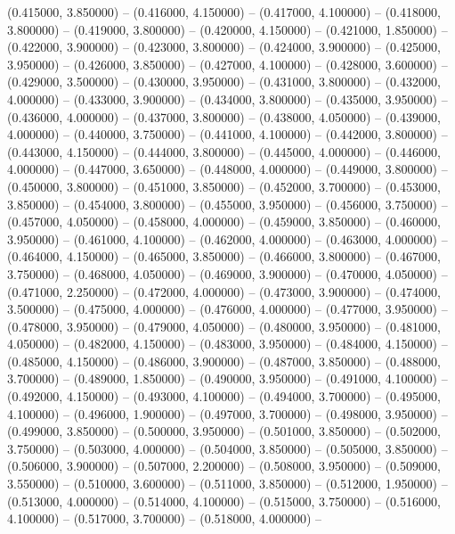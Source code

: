 (0.415000, 3.850000) -- 
(0.416000, 4.150000) -- 
(0.417000, 4.100000) -- 
(0.418000, 3.800000) -- 
(0.419000, 3.800000) -- 
(0.420000, 4.150000) -- 
(0.421000, 1.850000) -- 
(0.422000, 3.900000) -- 
(0.423000, 3.800000) -- 
(0.424000, 3.900000) -- 
(0.425000, 3.950000) -- 
(0.426000, 3.850000) -- 
(0.427000, 4.100000) -- 
(0.428000, 3.600000) -- 
(0.429000, 3.500000) -- 
(0.430000, 3.950000) -- 
(0.431000, 3.800000) -- 
(0.432000, 4.000000) -- 
(0.433000, 3.900000) -- 
(0.434000, 3.800000) -- 
(0.435000, 3.950000) -- 
(0.436000, 4.000000) -- 
(0.437000, 3.800000) -- 
(0.438000, 4.050000) -- 
(0.439000, 4.000000) -- 
(0.440000, 3.750000) -- 
(0.441000, 4.100000) -- 
(0.442000, 3.800000) -- 
(0.443000, 4.150000) -- 
(0.444000, 3.800000) -- 
(0.445000, 4.000000) -- 
(0.446000, 4.000000) -- 
(0.447000, 3.650000) -- 
(0.448000, 4.000000) -- 
(0.449000, 3.800000) -- 
(0.450000, 3.800000) -- 
(0.451000, 3.850000) -- 
(0.452000, 3.700000) -- 
(0.453000, 3.850000) -- 
(0.454000, 3.800000) -- 
(0.455000, 3.950000) -- 
(0.456000, 3.750000) -- 
(0.457000, 4.050000) -- 
(0.458000, 4.000000) -- 
(0.459000, 3.850000) -- 
(0.460000, 3.950000) -- 
(0.461000, 4.100000) -- 
(0.462000, 4.000000) -- 
(0.463000, 4.000000) -- 
(0.464000, 4.150000) -- 
(0.465000, 3.850000) -- 
(0.466000, 3.800000) -- 
(0.467000, 3.750000) -- 
(0.468000, 4.050000) -- 
(0.469000, 3.900000) -- 
(0.470000, 4.050000) -- 
(0.471000, 2.250000) -- 
(0.472000, 4.000000) -- 
(0.473000, 3.900000) -- 
(0.474000, 3.500000) -- 
(0.475000, 4.000000) -- 
(0.476000, 4.000000) -- 
(0.477000, 3.950000) -- 
(0.478000, 3.950000) -- 
(0.479000, 4.050000) -- 
(0.480000, 3.950000) -- 
(0.481000, 4.050000) -- 
(0.482000, 4.150000) -- 
(0.483000, 3.950000) -- 
(0.484000, 4.150000) -- 
(0.485000, 4.150000) -- 
(0.486000, 3.900000) -- 
(0.487000, 3.850000) -- 
(0.488000, 3.700000) -- 
(0.489000, 1.850000) -- 
(0.490000, 3.950000) -- 
(0.491000, 4.100000) -- 
(0.492000, 4.150000) -- 
(0.493000, 4.100000) -- 
(0.494000, 3.700000) -- 
(0.495000, 4.100000) -- 
(0.496000, 1.900000) -- 
(0.497000, 3.700000) -- 
(0.498000, 3.950000) -- 
(0.499000, 3.850000) -- 
(0.500000, 3.950000) -- 
(0.501000, 3.850000) -- 
(0.502000, 3.750000) -- 
(0.503000, 4.000000) -- 
(0.504000, 3.850000) -- 
(0.505000, 3.850000) -- 
(0.506000, 3.900000) -- 
(0.507000, 2.200000) -- 
(0.508000, 3.950000) -- 
(0.509000, 3.550000) -- 
(0.510000, 3.600000) -- 
(0.511000, 3.850000) -- 
(0.512000, 1.950000) -- 
(0.513000, 4.000000) -- 
(0.514000, 4.100000) -- 
(0.515000, 3.750000) -- 
(0.516000, 4.100000) -- 
(0.517000, 3.700000) -- 
(0.518000, 4.000000) -- 
